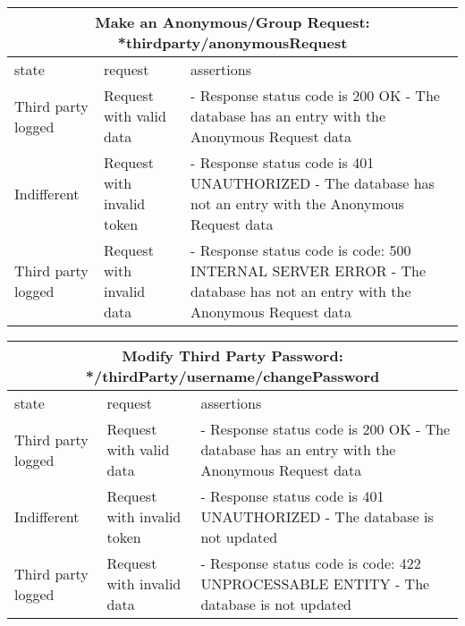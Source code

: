 \begin{center}
	\begin{tabular}{|p{}|p{}|p{}|}
		\hline
		\multicolumn{3}{c}{Make an Anonymous/Group Request: *thirdparty/anonymousRequest}\\

		\hline
		state & request & assertions \\
		
		\hline
		Third party logged&
		Request with valid data & 
		- Response status code is 200 OK\newline
		- The database has an entry with the Anonymous Request data
		\\
		
		\hline
		Indifferent&
		Request with invalid token & 
		- Response status code is 401 UNAUTHORIZED \newline
		- The database has not an entry with the Anonymous Request data
		\\
		
		\hline
		Third party logged&
		Request with invalid data & 
		- Response status code is code: 500 INTERNAL SERVER ERROR\newline
		- The database has not an entry with the Anonymous Request data
		\\
		
		\hline

	\end{tabular}
\end{center}

\begin{center}
	\begin{tabular}{|p{}|p{}|p{}|}
		\hline
		\multicolumn{3}{c}{Modify Third Party Password: */thirdParty/username/changePassword}\\

		\hline
		state & request & assertions \\
		
		\hline
		Third party logged&
		Request with valid data & 
		- Response status code is 200 OK\newline
		- The database has an entry with the Anonymous Request data
		\\
		
		\hline
		Indifferent&
		Request with invalid token & 
		- Response status code is 401 UNAUTHORIZED \newline
		- The database is not updated
		\\
		
		\hline
		Third party logged&
		Request with invalid data & 
		- Response status code is code: 422 UNPROCESSABLE ENTITY\newline
		- The database is not updated
		\\
		
		\hline

	\end{tabular}
\end{center}

